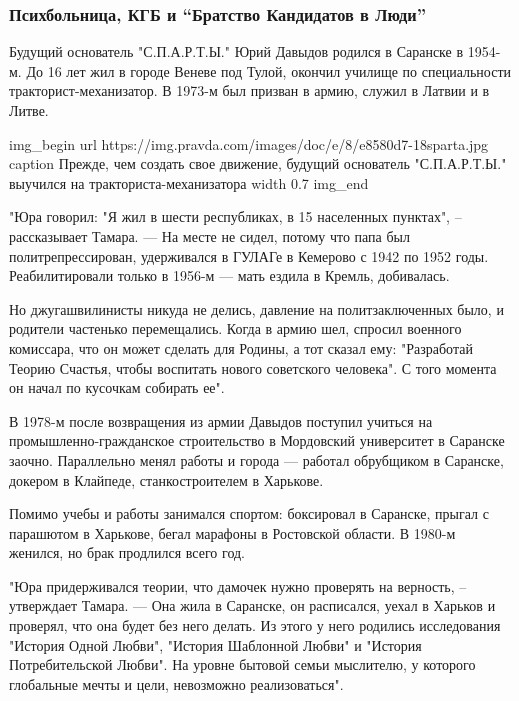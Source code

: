  
 
 

\subsubsection{Психбольница, КГБ и ``Братство Кандидатов в Люди''}
\label{sec:25_10_2019.news.pravda_com_ua.SPARTA.psih_bolnica_KGB_bratstvo}

Будущий основатель "С.П.А.Р.Т.Ы." Юрий Давыдов родился в Саранске в 1954-м. До
16 лет жил в городе Веневе под Тулой, окончил училище по специальности
тракторист-механизатор. В 1973-м был призван в армию, служил в Латвии и в
Литве.

\ifcmt
img_begin 
	url https://img.pravda.com/images/doc/e/8/e8580d7-18sparta.jpg
	caption Прежде, чем создать свое движение, будущий основатель "С.П.А.Р.Т.Ы." выучился на тракториста-механизатора
	width 0.7
img_end
\fi

"Юра говорил: "Я жил в шести республиках, в 15 населенных пунктах", –
рассказывает Тамара. --- На месте не сидел, потому что папа был
политрепрессирован, удерживался в ГУЛАГе в Кемерово с 1942 по 1952 годы.
Реабилитировали только в 1956-м --- мать ездила в Кремль, добивалась. 

Но джугашвилинисты никуда не делись, давление на политзаключенных было, и
родители частенько перемещались. Когда в армию шел, спросил военного комиссара,
что он может сделать для Родины, а тот сказал ему: "Разработай Теорию Счастья,
чтобы воспитать нового советского человека". С того момента он начал по
кусочкам собирать ее".

В 1978-м после возвращения из армии Давыдов поступил учиться на
промышленно-гражданское строительство в Мордовский университет в Саранске
заочно. Параллельно менял работы и города --- работал обрубщиком в Саранске,
докером в Клайпеде, станкостроителем в Харькове. 

Помимо учебы и работы занимался спортом: боксировал в Саранске, прыгал с
парашютом в Харькове, бегал марафоны в Ростовской области. В 1980-м женился, но
брак продлился всего год.

"Юра придерживался теории, что дамочек нужно проверять на верность, –
утверждает Тамара. --- Она жила в Саранске, он расписался, уехал в Харьков и
проверял, что она будет без него делать. Из этого у него родились исследования
"История Одной Любви", "История Шаблонной Любви" и "История Потребительской
Любви". На уровне бытовой семьи мыслителю, у которого глобальные мечты и цели,
невозможно реализоваться".

